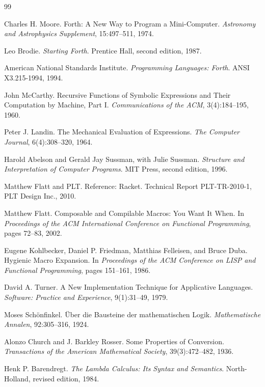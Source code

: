 \begin{thebibliography}{99}

 Charles H. Moore. Forth: A New Way to Program a Mini-Computer. \emph{Astronomy and Astrophysics Supplement}, 15:497--511, 1974.

 Leo Brodie. \emph{Starting Forth}. Prentice Hall, second edition, 1987.

 American National Standards Institute. \emph{Programming Languages: Forth}. ANSI X3.215-1994, 1994.

 John McCarthy. Recursive Functions of Symbolic Expressions and Their Computation by Machine, Part I. \emph{Communications of the ACM}, 3(4):184--195, 1960.

 Peter J. Landin. The Mechanical Evaluation of Expressions. \emph{The Computer Journal}, 6(4):308--320, 1964.

 Harold Abelson and Gerald Jay Sussman, with Julie Sussman. \emph{Structure and Interpretation of Computer Programs}. MIT Press, second edition, 1996.

 Matthew Flatt and PLT. Reference: Racket. Technical Report PLT-TR-2010-1, PLT Design Inc., 2010.

 Matthew Flatt. Composable and Compilable Macros: You Want It When. In \emph{Proceedings of the ACM International Conference on Functional Programming}, pages 72--83, 2002.

 Eugene Kohlbecker, Daniel P. Friedman, Matthias Felleisen, and Bruce Duba. Hygienic Macro Expansion. In \emph{Proceedings of the ACM Conference on LISP and Functional Programming}, pages 151--161, 1986.

 David A. Turner. A New Implementation Technique for Applicative Languages. \emph{Software: Practice and Experience}, 9(1):31--49, 1979.

 Moses Sch{\"o}nfinkel. {\"U}ber die Bausteine der mathematischen Logik. \emph{Mathematische Annalen}, 92:305--316, 1924.

 Alonzo Church and J. Barkley Rosser. Some Properties of Conversion. \emph{Transactions of the American Mathematical Society}, 39(3):472--482, 1936.

 Henk P. Barendregt. \emph{The Lambda Calculus: Its Syntax and Semantics}. North-Holland, revised edition, 1984.


\end{thebibliography}
